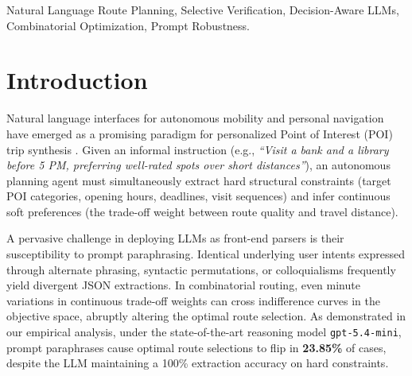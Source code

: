 \documentclass[conference]{IEEEtran}
\begin{document}
\begin{IEEEkeywords}
Natural Language Route Planning, Selective Verification, Decision-Aware LLMs, Combinatorial Optimization, Prompt Robustness.
\end{IEEEkeywords}

\section{Introduction}

Natural language interfaces for autonomous mobility and personal navigation have emerged as a promising paradigm for personalized Point of Interest (POI) trip synthesis \cite{liang2025llmap, wang2025constraint}. Given an informal instruction (e.g., \textit{``Visit a bank and a library before 5 PM, preferring well-rated spots over short distances''}), an autonomous planning agent must simultaneously extract hard structural constraints (target POI categories, opening hours, deadlines, visit sequences) and infer continuous soft preferences (the trade-off weight between route quality and travel distance).

A pervasive challenge in deploying LLMs as front-end parsers is their susceptibility to prompt paraphrasing. Identical underlying user intents expressed through alternate phrasing, syntactic permutations, or colloquialisms frequently yield divergent JSON extractions. In combinatorial routing, even minute variations in continuous trade-off weights can cross indifference curves in the objective space, abruptly altering the optimal route selection. As demonstrated in our empirical analysis, under the state-of-the-art reasoning model \texttt{gpt-5.4-mini}, prompt paraphrases cause optimal route selections to flip in \textbf{23.85\%} of cases, despite the LLM maintaining a 100\% extraction accuracy on hard constraints.
\end{document}
